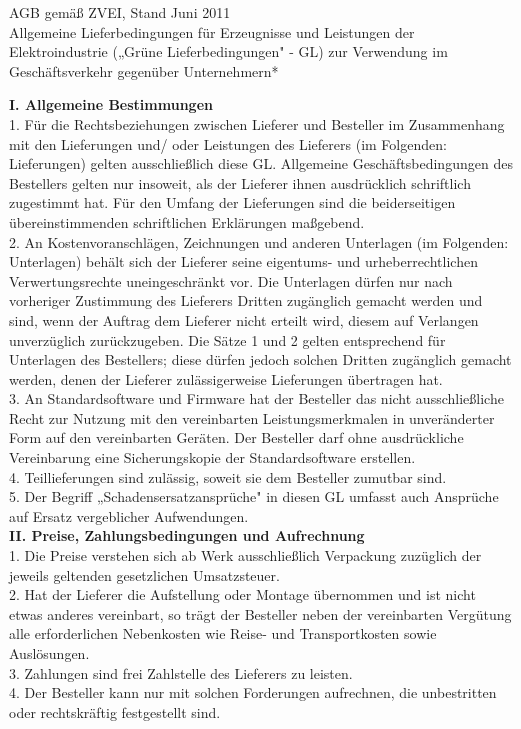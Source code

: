 AGB gemäß ZVEI, Stand Juni 2011\\\newline
Allgemeine Lieferbedingungen für Erzeugnisse und Leistungen der Elektroindustrie („Grüne Lieferbedingungen" - GL) zur Verwendung im Geschäftsverkehr gegenüber Unternehmern*
\setlength{\columnsep}{1em}
\begin{multicols}{2}
	\begin{scriptsize}
	\textbf{I. Allgemeine Bestimmungen}\\
	\fontsize{9}{9}\selectfont{}
	1. Für die Rechtsbeziehungen zwischen Lieferer und Besteller im Zusammenhang mit den Lieferungen und/ oder Leistungen des Lieferers (im Folgenden: Lieferungen) gelten ausschließlich diese GL. Allgemeine Geschäftsbedingungen des Bestellers gelten nur insoweit, als der Lieferer ihnen ausdrücklich schriftlich zugestimmt hat. Für den Umfang der Lieferungen sind die beiderseitigen übereinstimmenden schriftlichen Erklärungen maßgebend.\\	
	2. An Kostenvoranschlägen, Zeichnungen und anderen Unterlagen (im Folgenden: Unterlagen) behält sich der Lieferer seine eigentums- und urheberrechtlichen Verwertungsrechte uneingeschränkt vor. Die Unterlagen dürfen nur nach vorheriger Zustimmung des Lieferers Dritten zugänglich gemacht werden und sind, wenn der Auftrag dem Lieferer nicht erteilt wird, diesem auf Verlangen unverzüglich zurückzugeben. Die Sätze 1 und 2 gelten entsprechend für Unterlagen des Bestellers; diese dürfen jedoch solchen Dritten zugänglich gemacht werden, denen der Lieferer zulässigerweise Lieferungen übertragen hat.\\	
	3. An Standardsoftware und Firmware hat der Besteller das nicht ausschließliche Recht zur Nutzung mit den vereinbarten Leistungsmerkmalen in unveränderter Form auf den vereinbarten Geräten. Der Besteller darf ohne ausdrückliche Vereinbarung eine Sicherungskopie der Standardsoftware erstellen.\\
	4. Teillieferungen sind zulässig, soweit sie dem Besteller zumutbar sind.\\
	5. Der Begriff „Schadensersatzansprüche" in diesen GL umfasst auch Ansprüche auf Ersatz vergeblicher Aufwendungen.\\
	\textbf{II. Preise, Zahlungsbedingungen und Aufrechnung}\\
	1. Die Preise verstehen sich ab Werk ausschließlich Verpackung zuzüglich der jeweils geltenden gesetzlichen Umsatzsteuer.\\
	2. Hat der Lieferer die Aufstellung oder Montage übernommen und ist nicht etwas anderes vereinbart, so trägt der Besteller neben der vereinbarten Vergütung alle erforderlichen Nebenkosten wie Reise- und Transportkosten sowie Auslösungen.\\
	3. Zahlungen sind frei Zahlstelle des Lieferers zu leisten.\\
	4. Der Besteller kann nur mit solchen Forderungen aufrechnen, die unbestritten oder rechtskräftig festgestellt sind.
	

\end{scriptsize}
\end{multicols}
